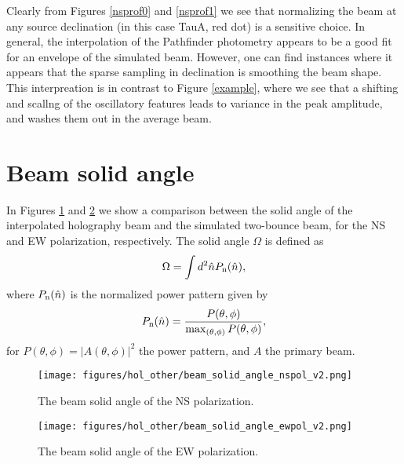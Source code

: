 \newpage

Clearly from Figures \ref{nsprof0} and \ref{nsprof1} we see that normalizing the beam at any source declination (in this case TauA, red dot) is a sensitive choice. In general, the interpolation of the Pathfinder photometry appears to be a good fit for an envelope of the simulated beam. However, one can find instances where it appears that the sparse sampling in declination is smoothing the beam shape. This interpreation is in contrast to Figure \ref{example}, where we see that a shifting and scallng of the oscillatory features leads to variance in the peak amplitude, and washes them out in the average beam.

\section{Beam solid angle}

In Figures \ref{bsans} and \ref{bsaew} we show a comparison between the solid angle of the interpolated holography beam and the simulated two-bounce beam, for the NS and EW polarization, respectively. The solid angle $\Omega$ is defined as
\begin{equation}
\Omega = \int d^2 \hat{n} P_{\rm n}(\hat{n}), \label{Omega}
\end{equation}
where $P_{\rm n}(\hat{n})$ is the normalized power pattern given by
\begin{equation}
P_{\rm n}(\hat{n}) = \frac{P(\theta, \phi)}{\max_{(\theta, \phi)} {P(\theta, \phi)}},
\end{equation}
for $P(\theta, \phi) = |A(\theta, \phi)|^2$ the power pattern, and $A$ the primary beam.

\begin{figure}[h!]
\begin{center}
\texttt{[image: figures/hol\_other/beam\_solid\_angle\_nspol\_v2.png]}
\caption{The beam solid angle of the NS polarization. \label{bsans}}
\end{center}
\end{figure}

\begin{figure}[h!]
\begin{center}
\texttt{[image: figures/hol\_other/beam\_solid\_angle\_ewpol\_v2.png]}
\caption{The beam solid angle of the EW polarization. \label{bsaew}}
\end{center}
\end{figure}

